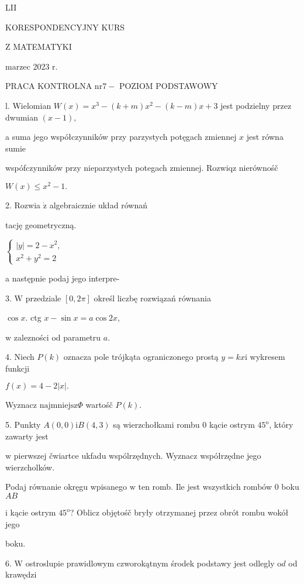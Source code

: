 \documentclass[a4paper,12pt]{article}
\begin{document}
LII

KORESPONDENCYJNY KURS

Z MATEMATYKI

marzec 2023 r.

PRACA KONTROLNA $\mathrm{n}\mathrm{r} 7-$ POZIOM PODSTAWOWY

l. Wielomian $W(x) =x^{3}-(k+m)x^{2}-(k-m)x+3$ jest podzielny przez dwumian $(x-1),$

a suma jego współczynników przy parzystych potęgach zmiennej $x$ jest równa sumie

wspófczynników przy nieparzystych potegach zmiennej. Rozwiqz nierównośč

$W(x)\leq x^{2}-1.$

2. Rozwia $\dot{\mathrm{z}}$ algebraicznie układ równań

tację geometryczną.

$\left\{\begin{array}{l}
|y|=2-x^{2},\\
x^{2}+y^{2}=2
\end{array}\right.$

a następnie podaj jego interpre-

3. $\mathrm{W}$ przedziale $[0,2\pi]$ określ liczbę rozwiązań równania

$\cos x$. ctg $x-\sin x=a\cos 2x,$

$\mathrm{w}$ zalezności od parametru $a.$

4. Niech $P(k)$ oznacza pole trójkąta ograniczonego prostą $y=kx\mathrm{i}$ wykresem funkcji

$f(x)=4-2|x|.$

Wyznacz $\mathrm{n}\mathrm{a}\mathrm{j}\mathrm{m}\mathrm{n}\mathrm{i}\mathrm{e}\mathrm{j}\mathrm{s}\mathrm{z}\Phi$ wartośč $P(k).$

5. Punkty $A(0,0)\mathrm{i}B(4,3)$ są wierzchołkami rombu $0$ kącie ostrym $45^{\mathrm{o}}$, który zawarty jest

$\mathrm{w}$ pierwszej čwiartce ukfadu wspólrzędnych. Wyznacz współrzędne jego wierzcholków.

Podaj równanie okręgu wpisanego $\mathrm{w}$ ten romb. Ile jest wszystkich rombów $0$ boku $AB$

$\mathrm{i}$ kącie ostrym $45^{\mathrm{o}}$? Oblicz objętośč bryły otrzymanej przez obrót rombu wokół jego

boku.

6. $\mathrm{W}$ ostroslupie prawidlowym czworokątnym środek podstawy jest odlegly $\mathrm{o}d$ od krawędzi
\end{document}
